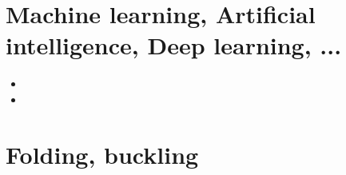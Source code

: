 \section{Machine learning, Artificial intelligence, Deep learning, ...}

\begin{scriptsize}
\begin{itemize}
\item[\twothousandtwentyone] 
\item[\twothousandtwentythree] 
\end{itemize}
\end{scriptsize}


\section{Folding, buckling} 

